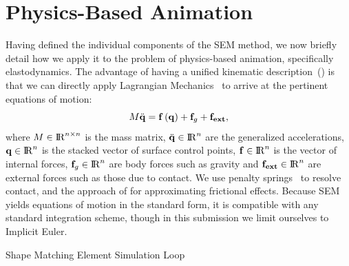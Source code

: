 \section{Physics-Based Animation}
Having defined the individual components of the SEM method, we now briefly detail how we apply it to the problem of 
physics-based animation, specifically elastodynamics. 
The advantage of having a unified kinematic description~() is that we can directly apply Lagrangian Mechanics~\cite{lanczos2012variational} to arrive at 
the pertinent equations of motion:
\begin{equation*}
    M\ddot{\mathbf{q}} = \mathbf{f}\left(\mathbf{q}\right) + \mathbf{f}_g + \mathbf{f_{ext}},
\end{equation*} where $M\in{\rm I\!R}^{n\times n}$ is the mass matrix, $\ddot{\mathbf{q}}\in{\rm I\!R}^{n}$ are the generalized accelerations, $\mathbf{q}\in{\rm I\!R}^{n}$ is the stacked vector of surface control points, $\mathbf{f}\in{\rm I\!R}^{n}$ is the 
vector of internal forces, $\mathbf{f}_g\in{\rm I\!R}^{n}$ are body forces such as gravity and $\mathbf{f_{ext}}\in{\rm I\!R}^{n}$ are external forces such as those due to contact. 
We use penalty springs~\cite{10.1145/1964921.1964932} to resolve contact, and the approach of \citet{10.1145/566654.566623} for approximating frictional effects. 
Because SEM yields equations of motion in the standard form, it is compatible with any standard integration scheme, though in this submission we limit ourselves to
Implicit Euler.

\begin{algorithm}[h]
	\begin{algorithmic}[1]
				
  			\EndFor
     	\EndWhile
	\EndProcedure
\end{algorithmic}
\caption{Shape Matching Element Simulation Loop}
\label{alg:sem_simulation}
\end{algorithm}

